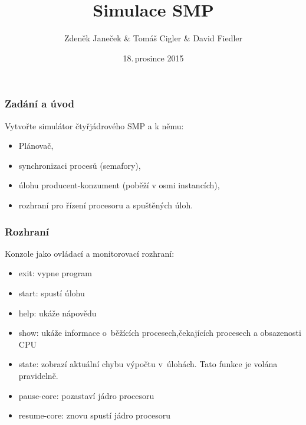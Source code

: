\documentclass{beamer}
\title{Simulace SMP}
\author{Zdeněk Janeček \& Tomáš Cigler \& David Fiedler}
\date{18.\,prosince 2015}
\begin{document}
\begin{frame} 
\titlepage
\end{frame}

\begin{frame} 
\frametitle{Zadání a úvod}
Vytvořte simulátor čtyřjádrového SMP a k němu:

\begin{itemize}
\item Plánovač,
\item synchronizaci procesů (semafory),
\item úlohu producent-konzument (poběží v osmi instancích),
\item rozhraní pro řízení procesoru a spuštěných úloh.
\end{itemize}

\end{frame}

\begin{frame} 
\frametitle{Rozhraní}

Konzole jako ovládací a monitorovací rozhraní:

\begin{itemize}
\item exit: vypne program
\item start: spustí úlohu
\item help: ukáže nápovědu
\item show: ukáže informace o~běžících procesech,čekajících procesech a obsazenosti CPU
\item state: zobrazí aktuální chybu výpočtu v~úlohách. Tato funkce je volána pravidelně.
\item pause-core: pozastaví jádro procesoru
\item resume-core: znovu spustí jádro procesoru
\end{itemize}

\end{frame}
\end{document}
